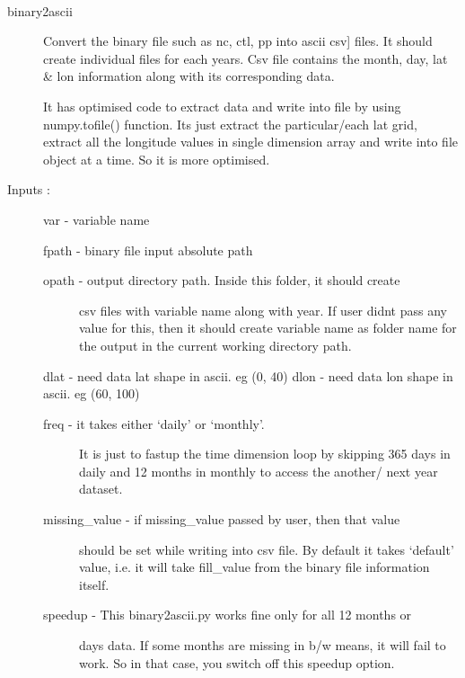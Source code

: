 \documentclass[letterpaper,10pt,english]{sphinxmanual}
\begin{document}
\begin{fulllineitems}
\label{others:binary2ascii.binary2ascii}~\begin{description}
\item[{binary2ascii}] \leavevmode{[}Convert the binary file such as nc, ctl, pp into ascii csv{]}
files. It should create individual files for each years.
Csv file contains the month, day, lat \& lon information
along with its corresponding data.

It has optimised code to extract data and write into file
by using numpy.tofile() function. Its just extract the
particular/each lat grid, extract all the longitude values
in single dimension array and write into file object at a
time. So it is more optimised.

\item[{Inputs :}] \leavevmode
var - variable name

fpath - binary file input absolute path
\begin{description}
\item[{opath - output directory path. Inside this folder, it should create}] \leavevmode
csv files with variable name along with year. If user didnt
pass any value for this, then it should create variable name
as folder name for the output in the current working
directory path.

\end{description}

dlat - need data lat shape in ascii. eg (0, 40)
dlon - need data lon shape in ascii. eg (60, 100)
\begin{description}
\item[{freq - it takes either `daily' or `monthly'.}] \leavevmode
It is just to fastup the time dimension loop by skipping 365
days in daily and 12 months in monthly to access the another/
next year dataset.

\item[{missing\_value - if missing\_value passed by user, then that value}] \leavevmode
should be set while writing into csv file. By default it takes
`default' value, i.e. it will take fill\_value from the binary
file information itself.

\item[{speedup - This binary2ascii.py works fine only for all 12 months or }]  days data. If some months are missing in b/w means, 
it will fail to work. So in that case, you switch off this 
speedup option.


\end{description}
\end{description}
\end{fulllineitems}
\end{document}
